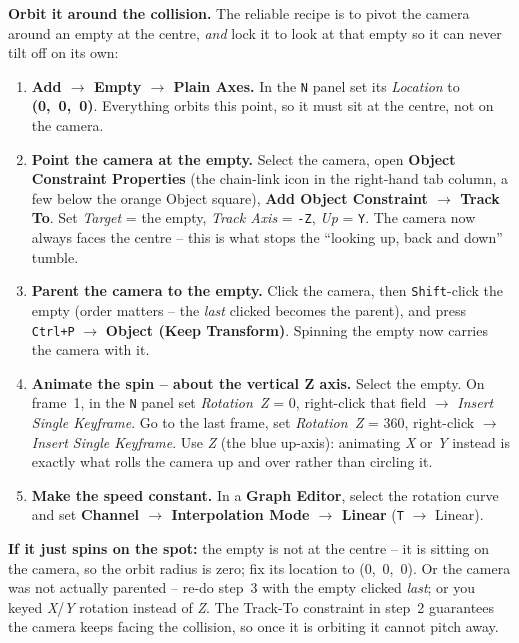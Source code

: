 \documentclass[11pt]{article}
\newcommand{\pc}[1]{\texttt{#1}}
\begin{document}
\textbf{Orbit it around the collision.} The reliable recipe is to pivot the
camera around an empty at the centre, \emph{and} lock it to look at that empty
so it can never tilt off on its own:
\begin{enumerate}
  \item \textbf{Add $\rightarrow$ Empty $\rightarrow$ Plain Axes.} In the \pc{N}
        panel set its \emph{Location} to \textbf{(0,~0,~0)}. Everything orbits
        this point, so it must sit at the centre, not on the camera.
  \item \textbf{Point the camera at the empty.} Select the camera, open
        \textbf{Object Constraint Properties} (the chain-link icon in the
        right-hand tab column, a few below the orange Object square),
        \textbf{Add Object Constraint $\rightarrow$ Track To}. Set \emph{Target}
        = the empty, \emph{Track Axis} = \pc{-Z}, \emph{Up} = \pc{Y}. The camera
        now always faces the centre -- this is what stops the ``looking up, back
        and down'' tumble.
  \item \textbf{Parent the camera to the empty.} Click the camera, then
        \pc{Shift}-click the empty (order matters -- the \emph{last} clicked
        becomes the parent), and press \pc{Ctrl+P} $\rightarrow$ \textbf{Object
        (Keep Transform)}. Spinning the empty now carries the camera with it.
  \item \textbf{Animate the spin -- about the vertical Z axis.} Select the
        empty. On frame~1, in the \pc{N} panel set \emph{Rotation~Z} = 0,
        right-click that field $\rightarrow$ \emph{Insert Single Keyframe}. Go to
        the last frame, set \emph{Rotation~Z} = 360, right-click $\rightarrow$
        \emph{Insert Single Keyframe}. Use \emph{Z} (the blue up-axis):
        animating \emph{X} or \emph{Y} instead is exactly what rolls the camera
        up and over rather than circling it.
  \item \textbf{Make the speed constant.} In a \textbf{Graph Editor}, select the
        rotation curve and set \textbf{Channel $\rightarrow$ Interpolation Mode
        $\rightarrow$ Linear} (\pc{T} $\rightarrow$ Linear).
\end{enumerate}
 
\noindent\textbf{If it just spins on the spot:} the empty is not
at the centre -- it is sitting on the camera, so the orbit radius is zero; fix
its location to (0,~0,~0). Or the camera was not actually parented -- re-do
step~3 with the empty clicked \emph{last}; or you keyed \emph{X}/\emph{Y}
rotation instead of \emph{Z}. The Track-To constraint in step~2 guarantees the
camera keeps facing the collision, so once it is orbiting it cannot pitch away.
 
\end{document}
